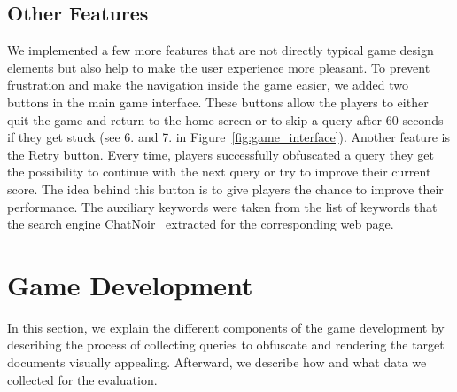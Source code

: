 \subsection*{Other Features}
We implemented a few more features that are not directly typical game design elements but also help to make the user experience more pleasant. To prevent frustration and make the navigation inside the game easier, we added two buttons in the main game interface. These buttons allow the players to either quit the game and return to the home screen or to skip a query after 60 seconds if they get stuck (see 6. and 7. in Figure~\ref{fig:game_interface}). Another feature is the Retry button. Every time, players successfully obfuscated a query they get the possibility to continue with the next query or try to improve their current score. The idea behind this button is to give players the chance to improve their performance. The auxiliary keywords were taken from the list of keywords that the search engine ChatNoir~\cite{chatnoir} extracted for the corresponding web page.

\section{Game Development}
In this section, we explain the different components of the game development by describing the process of collecting queries to obfuscate and rendering the target documents visually appealing. Afterward, we describe how and what data we collected for the evaluation.


